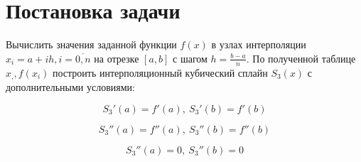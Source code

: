 \documentclass[12pt, a4paper]{article}
\begin{document}
	
	\begin{titlepage}
	\end{titlepage}
	
\tableofcontents
	
\section{Постановка задачи}

Вычислить значения заданной функции $f(x)$ в узлах интерполяции 
$x_i = a+ih, i = \overline{0,n}$ на отрезке $[a,b]$ с шагом $h = \frac{b-a}{n}$.
По полученной таблице ${x_,, f(x_i)}$ построить интерполяционный кубический сплайн 
$S_3(x)$ с дополнительными условиями:

	\begin{equation}
		S_3'(a) = f'(a),\ S_3'(b) = f'(b)
		\label{eq:condition_1}
	\end{equation}

	\begin{equation}
		S_3''(a) = f''(a),\ S_3''(b) = f''(b)
		\label{eq:condition_2}
	\end{equation}

	\begin{equation}
		S_3''(a)=0,\ S_3''(b) = 0
		\label{eq:condition_3}
	\end{equation}
\end{document}
